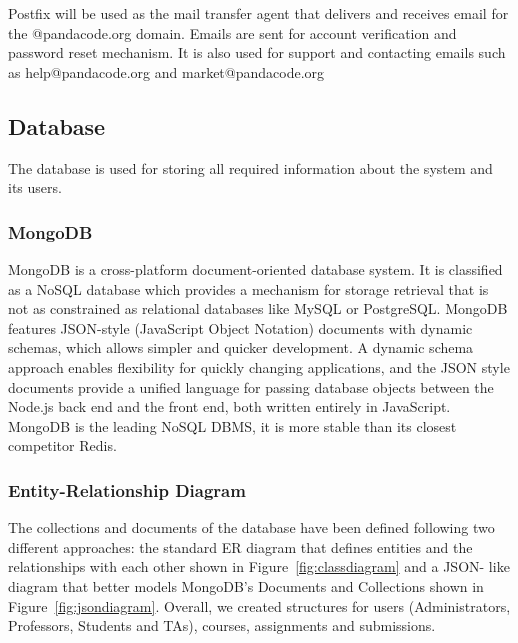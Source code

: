 Postfix\cite{postfix} will be used as the mail transfer agent that delivers and
receives email for the @pandacode.org domain. Emails are sent for account
verification and password reset mechanism. It is also used for support and
contacting emails such as help@pandacode.org and market@pandacode.org


\subsection{Database}

The database is used for storing all required information about the system and
its users.

\subsubsection{MongoDB}

MongoDB\cite{mongodb} is a cross-platform document-oriented database system. It
is classified as a NoSQL database which provides a mechanism for storage
retrieval that is not as constrained as relational databases like MySQL or
PostgreSQL. MongoDB features JSON-style (JavaScript Object Notation) documents
with dynamic schemas, which allows simpler and quicker development. A dynamic
schema approach enables flexibility for quickly changing applications, and the
JSON style documents provide a unified language for passing database objects
between the Node.js back end and the front end, both written entirely in
JavaScript. MongoDB is the leading NoSQL DBMS, it is more stable than its
closest competitor Redis.

\subsubsection{Entity-Relationship Diagram}

The collections and documents of the database have been defined following two
different approaches: the standard ER diagram that defines entities and the
relationships with each other shown in Figure~\ref{fig:classdiagram} and a JSON-
like diagram that better models MongoDB's Documents and Collections shown in
Figure~\ref{fig:jsondiagram}. Overall, we created structures for users
(Administrators, Professors, Students and TAs), courses, assignments and
submissions.

